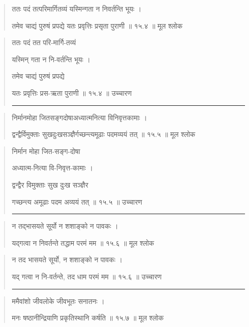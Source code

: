 \begin{quotation}

ततः पदं तत्परिमार्गितव्यं यस्मिन्गता न निवर्तन्ति भूयः  ।  

तमेव चाद्यं पुरुषं प्रपद्ये यतः प्रवृत्तिः प्रसृता पुराणी  ॥ १५.४ ॥  मूल श्लोक
\end{quotation}

\begin{quotation}

ततः पदं तत परि-मार्गि-तव्यं

यस्मिन् गता न नि-वर्तन्ति भूयः  ।  

तमेव चाद्यं पुरुषं प्रपद्ये 

यतः प्रवृत्तिः प्रस-ऋता पुराणी  ॥ १५.४ ॥  उच्चारण

\noindent\rule{16cm}{0.4pt} 
\end{quotation}


\begin{quotation}
निर्मानमोहा जितसङ्गदोषाअध्यात्मनित्या विनिवृत्तकामाः  ।  

द्वन्द्वैर्विमुक्ताः सुखदुःखसञ्ज्ञैर्गच्छन्त्यमूढाः पदमव्ययं तत्‌  ॥ १५.५ ॥  मूल श्लोक
\end{quotation}

\begin{quotation}

निर्मान मोहा जित-सङ्ग-दोषा

अध्यात्म-नित्या वि-निवृत्त-कामाः  ।  

द्वन्द्वैर विमुक्ताः सुख दुःख सञ्ज्ञैर 

गच्छन्त्य अमूढाः पदम अव्ययं तत्‌  ॥ १५.५ ॥  उच्चारण

\noindent\rule{16cm}{0.4pt} 
\end{quotation}


\begin{quotation}

न तद्भासयते सूर्यो न शशाङ्को न पावकः  ।  

यद्गत्वा न निवर्तन्ते तद्धाम परमं मम  ॥ १५.६ ॥  मूल श्लोक
\end{quotation}

\begin{quotation}

न तद भासयते सूर्यो, न शशाङ्को न पावकः  ।  

यद् गत्वा न नि-वर्तन्ते, तद धाम परमं मम  ॥ १५.६ ॥  उच्चारण

\noindent\rule{16cm}{0.4pt} 
\end{quotation}


\begin{quotation}

ममैवांशो जीवलोके जीवभूतः सनातनः  ।  

मनः षष्ठानीन्द्रियाणि प्रकृतिस्थानि कर्षति  ॥ १५.७ ॥  मूल श्लोक
\end{quotation}

